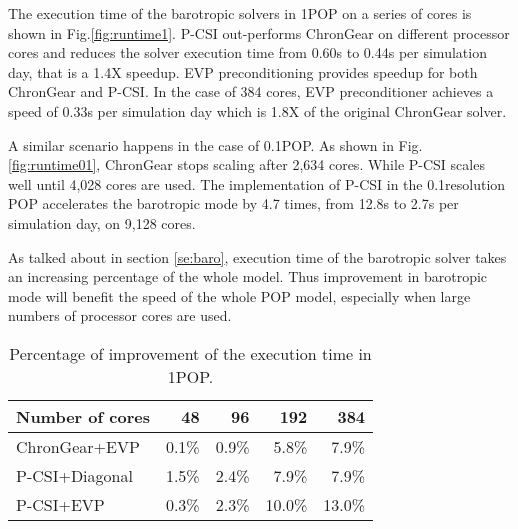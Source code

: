 The execution time of the barotropic solvers in 1\degree POP on a series of cores is shown in Fig.\ref{fig:runtime1}. 
P-CSI out-performs ChronGear on different processor cores and reduces the solver execution time from 0.60s to 0.44s per simulation day, that is a 1.4X speedup. 
EVP preconditioning provides speedup for both ChronGear and P-CSI. In the case of 384 cores, EVP preconditioner achieves a speed of 0.33s per simulation day which is 1.8X of the original ChronGear solver. 

A similar scenario happens in the case of 0.1\degree POP. 
As shown in Fig.\ref{fig:runtime01}, ChronGear stops scaling after 2,634 cores. While P-CSI scales well until 4,028 cores are used. 
The implementation of P-CSI in the 0.1\degree resolution POP accelerates the barotropic mode by 4.7 times, from 12.8s to 2.7s per simulation day, on 9,128 cores. 






As talked about in section \ref{se:baro}, execution time of the barotropic solver takes an increasing percentage of the whole model. 
Thus improvement in barotropic mode will benefit the speed of the whole POP model, especially when large numbers of processor cores are used. 
\begin{table}[!h]
\centering
\caption{Percentage of improvement of the execution time in 1\degree POP. \label{tab:improve_1}}
\begin{tabular}{|l|r|r|r|r|}
\hline
Number of cores & 48  & 96  & 192& 384 \\\hline
ChronGear+EVP &0.1\% &0.9\%	&5.8\%&7.9\% \\\hline
P-CSI+Diagonal  & 1.5\% &2.4\%&7.9\%  &7.9\% \\\hline
P-CSI+EVP	      &0.3\%& 2.3\%	&10.0\%  &13.0\% \\\hline
\end{tabular}
\end{table}

